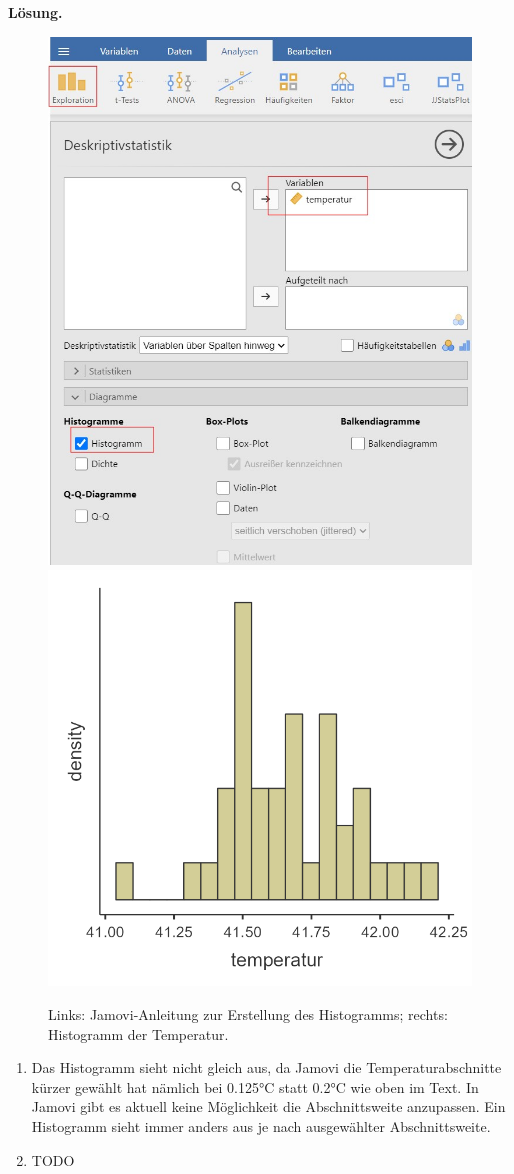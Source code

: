 \documentclass[
]{book}
\newenvironment{solution}{\par\textbf{Lösung.} }{\par}
\begin{document}
\begin{solution}
\leavevmode

\begin{figure}
  \includegraphics[width=0.5\linewidth]{figures/Enten_n40_instr_histogramm} \includegraphics[width=0.5\linewidth]{figures/Enten_n40} \caption{Links: Jamovi-Anleitung zur Erstellung des Histogramms; rechts: Histogramm der Temperatur.}\label{fig:unnamed-chunk-8}
  \end{figure}

\begin{enumerate}
\def\labelenumi{(\alph{enumi})}
\item
  Das Histogramm sieht nicht gleich aus, da Jamovi die Temperaturabschnitte kürzer gewählt hat nämlich bei 0.125°C statt 0.2°C wie oben im Text. In Jamovi gibt es aktuell keine Möglichkeit die Abschnittsweite anzupassen. Ein Histogramm sieht immer anders aus je nach ausgewählter Abschnittsweite.
\item
  TODO
\end{enumerate}

\end{solution}
\end{document}
